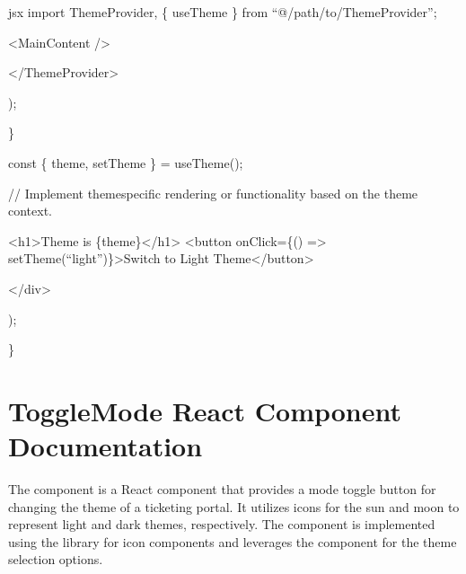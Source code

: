 \documentclass[letterpaper,10pt,english]{sphinxmanual}
\begin{document}
\sphinxAtStartPar
{\color{red}\bfseries{}\textasciigrave{}\textasciigrave{}}{\color{red}\bfseries{}\textasciigrave{}}jsx
import ThemeProvider, \{ useTheme \} from “@/path/to/ThemeProvider”;
\begin{description}
\begin{description}
\begin{description}
\sphinxAtStartPar
\textless{}MainContent /\textgreater{}

\end{description}

\sphinxAtStartPar
\textless{}/ThemeProvider\textgreater{}

\end{description}

\sphinxAtStartPar
);

\end{description}

\sphinxAtStartPar
\}
\begin{description}
\sphinxAtStartPar
const \{ theme, setTheme \} = useTheme();

\sphinxAtStartPar
// Implement theme\sphinxhyphen{}specific rendering or functionality based on the theme context.
\begin{description}
\begin{description}
\sphinxAtStartPar
\textless{}h1\textgreater{}Theme is \{theme\}\textless{}/h1\textgreater{}
\textless{}button onClick=\{() =\textgreater{} setTheme(“light”)\}\textgreater{}Switch to Light Theme\textless{}/button\textgreater{}

\end{description}

\sphinxAtStartPar
\textless{}/div\textgreater{}

\end{description}

\sphinxAtStartPar
);

\end{description}

\sphinxAtStartPar
\}

\sphinxstepscope


\section{ToggleMode React Component Documentation}
\label{\detokenize{forms/toggle:modetoggle-react-component-documentation}}\label{\detokenize{forms/toggle::doc}}
\sphinxAtStartPar
The  component is a React component that provides a mode toggle button for changing the theme of a ticketing portal. It utilizes icons for the sun and moon to represent light and dark themes, respectively. The component is implemented using the  library for icon components and leverages the  component for the theme selection options.
\end{document}
